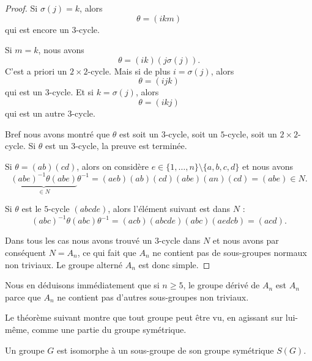 \begin{proof}
    Si \( \sigma(j)=k\), alors
    \begin{equation}
        \theta=(ikm)
    \end{equation}
    qui est encore un \( 3\)-cycle.

    Si \( m=k\), nous avons
    \begin{equation}
        \theta=(ik)(j\sigma(j)).
    \end{equation}
    C'est a priori un \( 2\times 2\)-cycle. Mais si de plus \( i=\sigma(j)\), alors
    \begin{equation}
        \theta=(ijk)
    \end{equation}
    qui est un \( 3\)-cycle. Et si \( k=\sigma(j)\), alors
    \begin{equation}
        \theta=(ikj)
    \end{equation}
    qui est un autre \( 3\)-cycle.

    Bref nous avons montré que \( \theta\) est soit un \( 3\)-cycle, soit un \( 5\)-cycle, soit un \( 2\times 2\)-cycle. Si \( \theta\) est un \( 3\)-cycle, la preuve est terminée.

    Si \( \theta=(ab)(cd)\), alors on considère \( e\in \{ 1,\ldots, n \}\setminus\{ a,b,c,d \}\) et nous avons
    \begin{equation}
        \underbrace{(abe)^{-1}\theta(abe)}_{\in N}\theta^{-1}=(aeb)(ab)(cd)(abe)(an)(cd)=(abe)\in N.
    \end{equation}
    
    Si \( \theta\) est le \( 5\)-cycle \( (abcde)\), alors l'élément suivant est dans \( N\) :
    \begin{equation}
        (abc)^{-1}\theta(abc)\theta^{-1}=(acb)(abcde)(abc)(aedcb)=(acd).
    \end{equation}
    
    Dans tous les cas nous avons trouvé un \( 3\)-cycle dans \( N\) et nous avons par conséquent \( N=A_n\), ce qui fait que \( A_n\) ne contient pas de sous-groupes normaux non triviaux. Le groupe alterné \( A_n\) est donc simple.
\end{proof}

Nous en déduisons immédiatement que si \( n\geq 5\), le groupe dérivé de \( A_n\) est \( A_n\) parce que \( A_n\) ne contient pas d'autres sous-groupes non triviaux.

Le théorème suivant montre que tout groupe peut être vu, en agissant sur lui-même, comme une partie du groupe symétrique.
\begin{theorem}
    Un groupe \( G\) est isomorphe à un sous-groupe de son groupe symétrique \( S(G)\).
\end{theorem}


